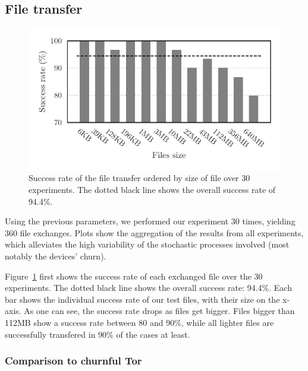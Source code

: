 
\subsection{File transfer}
\label{sub:file_transfer}

\begin{figure}[t]
  \centering
  \includegraphics[width=0.9\columnwidth]{figures/completion_vs_size.pdf}

  \caption{\label{fig:completion_vs_size}
  Success rate of the file transfer ordered by size of file over 30 experiments.
  The dotted black line shows the overall success rate of 94.4\%.}
\end{figure}


Using the previous parameters, we performed our experiment 30 times, yielding 360 file exchanges. Plots show the aggregation of the results from all experiments, which alleviates the high variability of the stochastic processes involved (most notably the devices' churn).

Figure~\ref{fig:completion_vs_size} first shows the success rate of each exchanged file over the 30 experiments.
The dotted black line shows the overall success rate: 94.4\%. 
Each bar shows the individual success rate of our test files, with their size on the x-axis.
As one can see, the success rate drops as files get bigger.
Files bigger than 112MB show a success rate between 80 and 90\%, while all lighter files are successfully transfered in 90\% of the cases at least.

\subsubsection{Comparison to churnful Tor} %
\label{ssub:comparison_to_churnful_tor}

